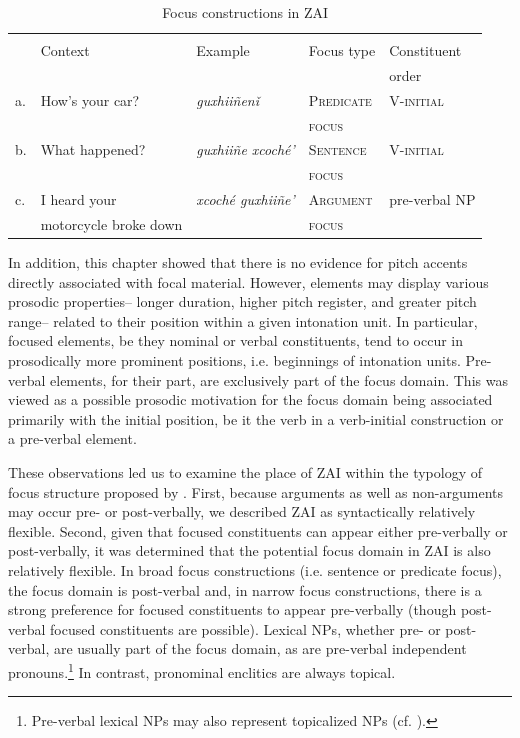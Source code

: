 \begin{table}
\caption{\small{Focus constructions in ZAI}}
\begin{tabular}{l l l  l l}
& & & & \\
 & Context & Example & Focus type & Constituent  \\
& & & & order \\
 
\lsptoprule
a. &  How's your car? & \textit{guxhii\~{n}en\v{i}} & \textsc{Predicate} & \textsc{V-initial} \\
 &   &  & \textsc{focus} &  \\
b. & What happened? & \textit{guxhii\~{n}e xcoch\'{e}'} & \textsc{Sentence} & \textsc{V-initial} \\
 &  &  & \textsc{focus} & \\
c. & I heard your & \textit{xcoch\'{e} guxhii\~{n}e'} & \textsc{Argument} & pre-verbal NP \\
 & motorcycle broke down  &  & \textsc{focus} & \\
 \end{tabular}
\end{table}\label{allfocus}


In addition, this chapter showed that there is no evidence for pitch accents directly associated with focal material. However, elements may display various prosodic properties-- longer duration, higher pitch register, and greater pitch range-- related to their position within a given intonation unit. In particular, focused elements, be they nominal or verbal constituents, tend to occur in prosodically more prominent positions, i.e. beginnings of intonation units. Pre-verbal elements, for their part, are exclusively part of the focus domain. This was viewed as a possible prosodic motivation for the focus domain being associated primarily with the initial position, be it the verb in a verb-initial construction or a pre-verbal element.

These observations led us to examine the place of ZAI within the typology of focus structure proposed by \citet{vanvalin1999}. First, because arguments as well as non-arguments may occur pre- or post-verbally, we described ZAI as syntactically relatively flexible. Second, given that focused constituents can appear either pre-verbally or post-verbally, it was determined that the potential focus domain in ZAI is also relatively flexible. In broad focus constructions (i.e. sentence or predicate focus), the focus domain is post-verbal and, in narrow focus constructions, there is a strong preference for focused constituents to appear pre-verbally (though post-verbal focused constituents are possible). Lexical NPs, whether pre- or post-verbal, are usually part of the focus domain, as are pre-verbal independent pronouns.\footnote{Pre-verbal lexical NPs may also represent topicalized NPs (cf. ).} In contrast, pronominal enclitics are always topical. 

